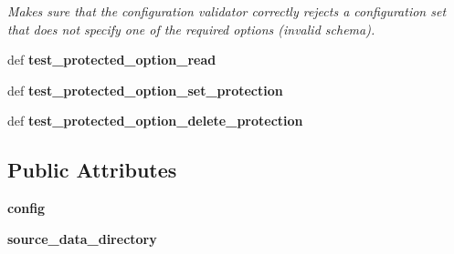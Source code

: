 \begin{DoxyCompactItemize}
\begin{DoxyCompactList}\small\item\em Makes sure that the configuration validator correctly rejects a configuration set that does not specify one of the required options (invalid schema). \end{DoxyCompactList}\item 
\hypertarget{classhwm_1_1core_1_1tests_1_1test__configuration_1_1_test_configuration_a696ce64435e758aee6434a729d1d08c5}{def {\bfseries test\-\_\-protected\-\_\-option\-\_\-read}}\label{classhwm_1_1core_1_1tests_1_1test__configuration_1_1_test_configuration_a696ce64435e758aee6434a729d1d08c5}

\item 
\hypertarget{classhwm_1_1core_1_1tests_1_1test__configuration_1_1_test_configuration_a5900af776af16be95fe427880cdf78ef}{def {\bfseries test\-\_\-protected\-\_\-option\-\_\-set\-\_\-protection}}\label{classhwm_1_1core_1_1tests_1_1test__configuration_1_1_test_configuration_a5900af776af16be95fe427880cdf78ef}

\item 
\hypertarget{classhwm_1_1core_1_1tests_1_1test__configuration_1_1_test_configuration_afff950a936cd73d1542e8b16398041b6}{def {\bfseries test\-\_\-protected\-\_\-option\-\_\-delete\-\_\-protection}}\label{classhwm_1_1core_1_1tests_1_1test__configuration_1_1_test_configuration_afff950a936cd73d1542e8b16398041b6}

\end{DoxyCompactItemize}
\subsection*{Public Attributes}
\begin{DoxyCompactItemize}
\item 
\hypertarget{classhwm_1_1core_1_1tests_1_1test__configuration_1_1_test_configuration_a7b03d30cc9acb5deeb12a55d1cdea015}{{\bfseries config}}\label{classhwm_1_1core_1_1tests_1_1test__configuration_1_1_test_configuration_a7b03d30cc9acb5deeb12a55d1cdea015}

\item 
\hypertarget{classhwm_1_1core_1_1tests_1_1test__configuration_1_1_test_configuration_af45c587122dd349022c2730e6205906d}{{\bfseries source\-\_\-data\-\_\-directory}}\label{classhwm_1_1core_1_1tests_1_1test__configuration_1_1_test_configuration_af45c587122dd349022c2730e6205906d}

\end{DoxyCompactItemize}


